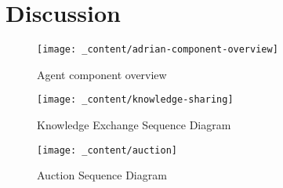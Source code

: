 \section{Discussion}
\label{sec:discussion}

\begin{figure}[H]
    \centering
    \texttt{[image: \_content/adrian-component-overview]}
    \caption{Agent component overview}
    \label{fig:component-overview}
\end{figure}

\begin{figure}[H]
    \centering
    \texttt{[image: \_content/knowledge-sharing]}
    \caption{Knowledge Exchange Sequence Diagram}
    \label{fig:knowledge-sharing}
\end{figure}


\begin{figure}[H]
    \centering
    \texttt{[image: \_content/auction]}
    \caption{Auction Sequence Diagram}
    \label{fig:auction}
\end{figure}
